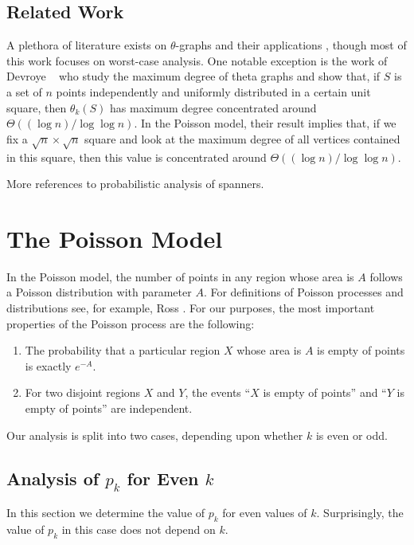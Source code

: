 \documentclass{patmorin}
\begin{document}
\subsection{Related Work}

A plethora of literature exists on $\theta$-graphs \cite{S} and
their applications \cite{S}, though most of this work focuses on
worst-case analysis.  One notable exception is the work of Devroye
\etal\ \cite{dgmXX} who study the maximum degree of theta graphs and
show that, if $S$ is a set of $n$ points independently and uniformly
distributed in a certain unit square, then $\theta_k(S)$ has maximum
degree concentrated around $\Theta((\log n)/\log\log n)$.  In the Poisson
model, their result implies that, if we fix a $\sqrt{n}\times\sqrt{n}$
square and look at the maximum degree of all vertices contained in this square,
then this value is concentrated around $\Theta((\log n)/\log\log n)$.

More references to probabilistic analysis of spanners.

\section{The Poisson Model}

In the Poisson model, the number of points in any region whose
area is $A$ follows a Poisson distribution with parameter $A$.  For
definitions of Poisson processes and distributions see, for example,
Ross \cite[Chapter~2]{ross:introduction}.  For our purposes, the most
important properties of the Poisson process are the following:
\begin{enumerate}
\item The probability  that a particular region $X$ whose area is $A$
   is empty of points is exactly $e^{-A}$.
\item For two disjoint regions $X$ and $Y$, the events ``$X$ is empty
   of points'' and ``$Y$ is empty of points'' are independent.
\end{enumerate}
Our analysis is split into two cases, depending upon whether $k$ is even
or odd.


\subsection{Analysis of $p_k$ for Even $k$}

In this section we determine the value of $p_k$ for even values of $k$.
Surprisingly, the value of $p_k$ in this case does not depend on $k$.
\end{document}
